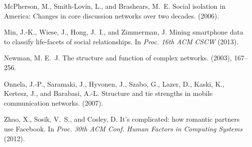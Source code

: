 \documentclass{sigchi}
\begin{document}
\begin{thebibliography}{10}
McPherson, M., Smith-Lovin, L., and Brashears, M.~E.
\newblock Social isolation in {America}: Changes in core discussion networks
  over two decades.
 (2006).

Min, J.-K., Wiese, J., Hong, J.~I., and Zimmerman, J.
\newblock Mining smartphone data to classify life-facets of social
  relationships.
\newblock In {\em Proc. 16th ACM CSCW} (2013). %


Newman, M. E.~J.
\newblock The structure and function of complex networks.
 (2003), 167--256.

Onnela, J.-P., Saramaki, J., Hyvonen, J., Szabo, G., Lazer, D., Kaski, K.,
  Kertesz, J., and Barabasi, A.-L.
\newblock Structure and tie strengths in mobile communication networks.
 (2007). %




Zhao, X., Sosik, V.~S., and Cosley, D.
\newblock It's complicated: how romantic partners use Facebook.
\newblock In {\em Proc. 30th ACM Conf. Human Factors in Computing
  Systems} (2012). %

\end{thebibliography}
\end{document}
